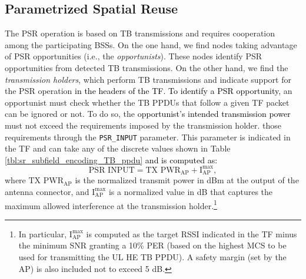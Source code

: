 \documentclass{ieeeaccess}
\begin{document}
\subsection{Parametrized Spatial Reuse}
\label{section:srp_based}	
The PSR operation is based on TB transmissions and requires cooperation among the participating BSSs. On the one hand, we find nodes taking advantage of PSR opportunities (i.e., the \emph{opportunists}). These nodes identify PSR opportunities from detected TB transmissions. On the other hand, we find the \emph{transmission holders}, which perform TB transmissions and indicate support for the PSR operation \textcolor{black}{in the headers of the TF. To identify a PSR opportunity,} an opportunist must check whether the TB PPDUs that follow a given TF packet can be ignored or not. To do so, the \textcolor{black}{opportunist's intended transmission power} must not exceed the requirements imposed by the transmission holder.  those requirements through the \texttt{PSR\_INPUT} parameter. This parameter is indicated in the TF and can take any of the discrete values shown in Table \ref{tbl:sr_subfield_encoding_TB_ppdu} \textcolor{black}{and is computed as:}
\begin{equation}
\text{PSR INPUT} = \text{TX PWR}_\text{AP} + \text{I}_\text{AP}^{\max},
\label{eq:srp_input}
\nonumber
\end{equation}
where $\text{TX PWR}_\text{AP}$ is the normalized transmit power in dBm at the output of the antenna connector, and $\text{I}_\text{AP}^{\max}$ is a normalized value in dB that captures the maximum allowed interference at the transmission holder.\footnote{In particular, $\text{I}_\text{AP}^{\max}$ is computed as the target RSSI indicated in the TF minus the minimum SNR granting a 10\% PER (based on the highest MCS to be used for transmitting the UL HE TB PPDU). A safety margin (set by the AP) is also included not to exceed 5 dB.}
\end{document}

